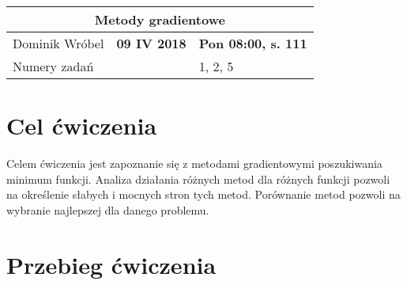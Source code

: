 \documentclass[a4paper,15pt]{article}
\begin{document}
\begin{table}
\begin{center}
\begin{tabular}{|l|l|l|}
\hline
\multicolumn{3}{|c|}{\textbf{Metody gradientowe}} \\ \hline Dominik Wróbel & \textbf{09 IV 2018} & \textbf{Pon 08:00, s. 111} \\ \hline
\multicolumn{2}{|l|}{Numery zadań} & 1, 2, 5 \\ \hline 

\end{tabular}
\end{center}
\end{table}

\section{Cel ćwiczenia}
Celem ćwiczenia jest zapoznanie się z metodami gradientowymi poszukiwania minimum funkcji. Analiza działania różnych metod  dla różnych funkcji pozwoli na określenie słabych i mocnych stron tych metod. Porównanie metod pozwoli na wybranie najlepszej dla danego problemu. 
\section{Przebieg ćwiczenia}
\end{document}
